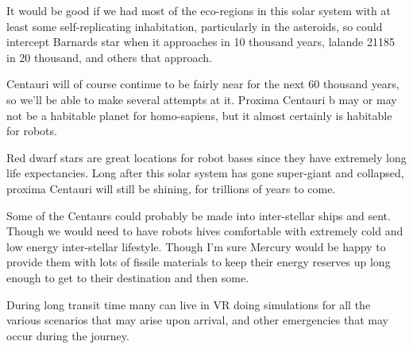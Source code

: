 It would be good if we had most of the eco-regions in this solar system with at
least some self-replicating inhabitation, particularly in the asteroids, so
could intercept Barnards star when it approaches in 10 thousand years, lalande
21185 in 20 thousand, and others that approach. 

Centauri will of course continue to be fairly near for the next 60 thousand
years, so we'll be able to make several attempts at it.  Proxima Centauri b may
or may not be a habitable planet for homo-sapiens, but it almost certainly is
habitable for robots. 

Red dwarf stars are great locations for robot bases since they have extremely
long life expectancies. Long after this solar system has gone super-giant and
collapsed, proxima Centauri will still be shining, for trillions of
years to come. 


Some of the Centaurs could probably be made into inter-stellar ships and sent.
Though we would need to have robots hives comfortable with extremely cold and
low energy inter-stellar lifestyle. Though I'm sure Mercury would be happy to
provide them with lots of fissile materials to keep their energy reserves up
long enough to get to their destination and then some. 

During long transit time many can live in VR doing simulations for all the
various scenarios that may arise upon arrival, and other emergencies that may
occur during the journey. 

